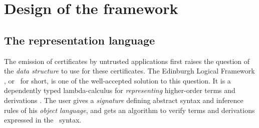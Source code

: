 \documentclass{llncs}
\begin{document}
\section{Design of the framework}

\subsection{The representation language}
\label{sec:repr}

The emission of certificates by untrusted applications first raises
the question of the \emph{data structure} to use for these
certificates. %
The Edinburgh Logical Framework \cite{harper1993framework}, or \LF\
for short, is one of the well-accepted solution to this question. It
is a dependently typed lambda-calculus for \emph{representing}
higher-order terms and derivations
\cite{pfenning1988higher}. The user gives a
\emph{signature} defining abstract syntax and inference rules of his
\emph{object language}, and gets an algorithm to verify terms and
derivations expressed in the \LF\ syntax.
\end{document}
